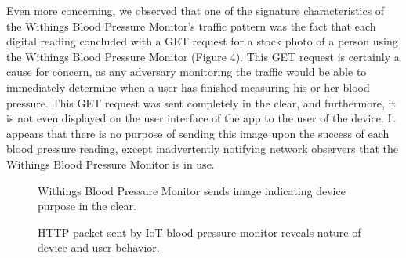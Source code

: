 Even more concerning, we observed that one of the signature characteristics of the Withings Blood Pressure Monitor's traffic pattern was the fact that each digital reading concluded with a GET request for a stock photo of a person using the Withings Blood Pressure Monitor (Figure 4). This GET request is certainly a cause for concern, as any adversary monitoring the traffic would be able to immediately determine when a user has finished measuring his or her blood pressure. This GET request was sent completely in the clear, and furthermore, it is not even displayed on the user interface of the app to the user of the device. It appears that there is no purpose of sending this image upon the success of each blood pressure reading, except inadvertently notifying network observers that the Withings Blood Pressure Monitor is in use. 

\begin{figure}
  \centering
     \caption{Withings Blood Pressure Monitor sends image indicating device purpose in the clear.}
     \label{fig:bp-image}
\end{figure}

\begin{figure}
  \centering
  \caption{HTTP packet sent by IoT blood pressure monitor reveals nature of device and user behavior.}
  \label{fig:bp-packet}
\end{figure}

